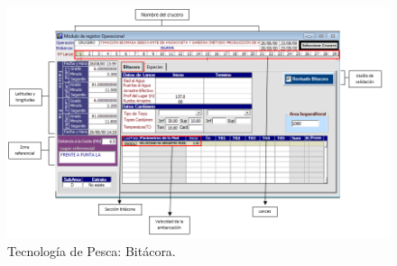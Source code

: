 \documentclass[a4paper,oneside,11pt]{book}
\begin{document}
         \begin{figure} [!h]
                 \begin{center}
               \includegraphics[scale=0.6]{imagen_manual_OPEMAR/casilla4.png}
                  \caption{Tecnología de Pesca: Bitácora.}
                 \end{center}
                  \end{figure}
      
      
 
\end{document}
